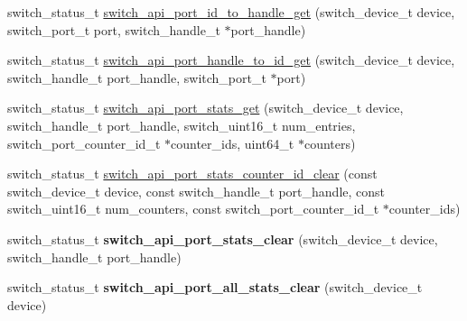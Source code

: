 \begin{DoxyCompactItemize}
\item 
switch\+\_\+status\+\_\+t \hyperlink{group__Port_ga81b2dc4b98de6c09ee757ffc368acb85}{switch\+\_\+api\+\_\+port\+\_\+id\+\_\+to\+\_\+handle\+\_\+get} (switch\+\_\+device\+\_\+t device, switch\+\_\+port\+\_\+t port, switch\+\_\+handle\+\_\+t $\ast$port\+\_\+handle)
\item 
switch\+\_\+status\+\_\+t \hyperlink{group__Port_gab2961d3b98bbe5297c433e211e6f9bf1}{switch\+\_\+api\+\_\+port\+\_\+handle\+\_\+to\+\_\+id\+\_\+get} (switch\+\_\+device\+\_\+t device, switch\+\_\+handle\+\_\+t port\+\_\+handle, switch\+\_\+port\+\_\+t $\ast$port)
\item 
switch\+\_\+status\+\_\+t \hyperlink{group__Port_ga660e63030eb7a16ffc27a19da3cd4c89}{switch\+\_\+api\+\_\+port\+\_\+stats\+\_\+get} (switch\+\_\+device\+\_\+t device, switch\+\_\+handle\+\_\+t port\+\_\+handle, switch\+\_\+uint16\+\_\+t num\+\_\+entries, switch\+\_\+port\+\_\+counter\+\_\+id\+\_\+t $\ast$counter\+\_\+ids, uint64\+\_\+t $\ast$counters)
\item 
switch\+\_\+status\+\_\+t \hyperlink{group__Port_ga27ceb0c47751ac0de7a45d70540ee648}{switch\+\_\+api\+\_\+port\+\_\+stats\+\_\+counter\+\_\+id\+\_\+clear} (const switch\+\_\+device\+\_\+t device, const switch\+\_\+handle\+\_\+t port\+\_\+handle, const switch\+\_\+uint16\+\_\+t num\+\_\+counters, const switch\+\_\+port\+\_\+counter\+\_\+id\+\_\+t $\ast$counter\+\_\+ids)
\item 
\hypertarget{group__Port_ga98e4a0ec715427cf0718043d96f1bfb8}{switch\+\_\+status\+\_\+t {\bfseries switch\+\_\+api\+\_\+port\+\_\+stats\+\_\+clear} (switch\+\_\+device\+\_\+t device, switch\+\_\+handle\+\_\+t port\+\_\+handle)}\label{group__Port_ga98e4a0ec715427cf0718043d96f1bfb8}

\item 
\hypertarget{group__Port_gaf540083d2d1afaa1838a5fdbed909761}{switch\+\_\+status\+\_\+t {\bfseries switch\+\_\+api\+\_\+port\+\_\+all\+\_\+stats\+\_\+clear} (switch\+\_\+device\+\_\+t device)}\label{group__Port_gaf540083d2d1afaa1838a5fdbed909761}


\end{DoxyCompactItemize}
